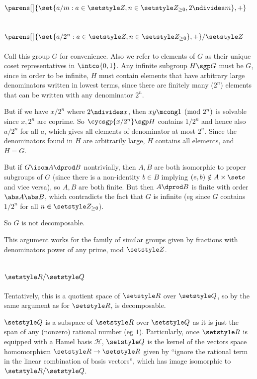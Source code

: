 \documentclass[fleqn,a4paper,11pt]{article}
\begin{document}
\section{\(\parens[\big]{
            \set{a / m : a \in \Z, n \in \Z_{\ge 0}, 2 \ndivides m}, +}\)}

\section{\(\parens[\big]{\set{a / 2^n : a \in \Z, n \in \Z_{\ge 0}}, +} / \Z\)}

Call this group \(G\) for convenience. Also we refer to elements of \(G\) as
their unique coset representatives in \(\intco{0, 1}\). Any infinite subgroup
\(H \sgp G\) must be \(G\), since in order to be infinite, \(H\) must contain
elements that have arbitrary large denominators written in lowest terms, since
there are finitely many (\(2^n\)) elements that can be written with any
denominator \(2^n\).

But if we have \(x/2^n\) where \(2 \ndivides x\), then
\(xy \mcong 1 \pmod{2^n}\) is solvable since \(x, 2^n\) are coprime. So
\(\cycsgp{x/2^n} \sgp H\) contains \(1/2^n\) and hence also \(a/2^n\) for all
\(a\), which gives all elements of denominator at most \(2^n\). Since the
denominators found in \(H\) are arbitrarily large, \(H\) contains all elements,
and \(H = G\).

But if \(G \isom A \dprod B\) nontrivially, then \(A, B\) are both isomorphic to
proper subgroups of \(G\) (since there is a non-identity \(b \in B\) implying
\((e, b) \notin A \times \set e\) and vice versa), so \(A, B\) are both finite.
But then \(A \dprod B\) is finite with order \(\abs A \abs B\), which
contradicts the fact that \(G\) is infinite (eg since \(G\) contains \(1/2^n\)
for all \(n \in \Z_{\ge 0}\)).

So \(G\) is not decomposable.

This argument works for the family of similar groups given by fractions with
denominators power of any prime, mod \(\Z\).

\section{\(\R / \Q\)}

Tentatively, this is a quotient space of \(\R\) over \(\Q\), so by
the same argument as for \(\R\), is decomposable.

\(\Q\) is a subspace of \(\R\) over \(\Q\) as it is just the span of any
(nonzero) rational number (eg \(1\)). Particularly, once \(\R\) is equipped with
a Hamel basis \(\mathcal H\), \(\Q\) is the kernel of the vectors space
homomorphism \(\R \to \R\) given by ``ignore the rational term in the linear
combination of basis vectors'', which has image isomorphic to \(\R / \Q\).
\end{document}
